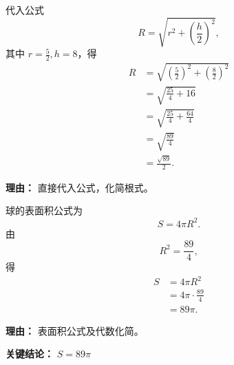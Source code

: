 \begin{examplebox}
\begin{description}[style=nextline, leftmargin=2.8em, labelsep=0.5em, itemsep=0.45em]
		\item[\textbf{第二步（求外接球半径）：}]
		      代入公式
		      \[
			      R = \sqrt{r^{2} + \left(\frac{h}{2}\right)^{2}},
		      \]
		      其中 $r=\frac{5}{2}, h=8$，得
		      \[
			      \begin{aligned}
				      R & = \sqrt{\left(\frac{5}{2}\right)^{2} + \left(\frac{8}{2}\right)^{2}} \\
				        & = \sqrt{\frac{25}{4} + 16}                                           \\
				        & = \sqrt{\frac{25}{4}+\frac{64}{4}}                                   \\
				        & = \sqrt{\frac{89}{4}}                                                \\
				        & = \frac{\sqrt{89}}{2}.
			      \end{aligned}
		      \]
		      \par\textbf{理由：} 直接代入公式，化简根式。

		\item[\textbf{第三步（求外接球表面积）：}]
		      球的表面积公式为
		      \[
			      S = 4\pi R^{2}.
		      \]
		      由
		      \[
			      R^{2} = \frac{89}{4},
		      \]
		      得
		      \[
			      \begin{aligned}
				      S & = 4\pi R^{2}              \\
				        & = 4\pi \cdot \frac{89}{4} \\
				        & = 89\pi.
			      \end{aligned}
		      \]
		      \par\textbf{理由：} 表面积公式及代数化简。
	\end{description}

	\textbf{\textcolor{CExample}{关键结论：}} \textbf{$S = 89\pi$}
\end{examplebox}
